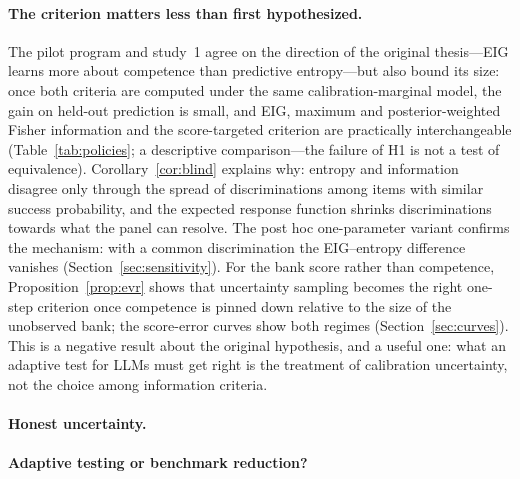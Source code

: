 \paragraph{The criterion matters less than first hypothesized.} The pilot program and
study~1 agree on the direction of the original thesis---EIG learns more about
competence than predictive entropy---but also bound its size: once both criteria are
computed under the same calibration-marginal model, the gain on held-out prediction is
small, and EIG, maximum and posterior-weighted Fisher information and the score-targeted
criterion are practically interchangeable (Table~\ref{tab:policies}; a descriptive
comparison---the failure of H1 is not a test of equivalence).
Corollary~\ref{cor:blind} explains why: entropy and information disagree only through the
spread of discriminations among items with similar success probability, and the
expected response function shrinks discriminations towards what the panel can resolve.
The post hoc one-parameter variant confirms the mechanism: with a common discrimination
the EIG--entropy difference vanishes (Section~\ref{sec:sensitivity}). For the bank score
rather than competence, Proposition~\ref{prop:evr} shows that uncertainty sampling becomes
the right one-step criterion once competence is pinned down relative to the size of the
unobserved bank; the score-error curves show both regimes (Section~\ref{sec:curves}).
This is a negative result about the original hypothesis, and a useful one: what an
adaptive test for LLMs must get right is the treatment of calibration uncertainty, not
the choice among information criteria.

\paragraph{Honest uncertainty.} \DiscussionUncertainty

\paragraph{Adaptive testing or benchmark reduction?} \DiscussionReduction

